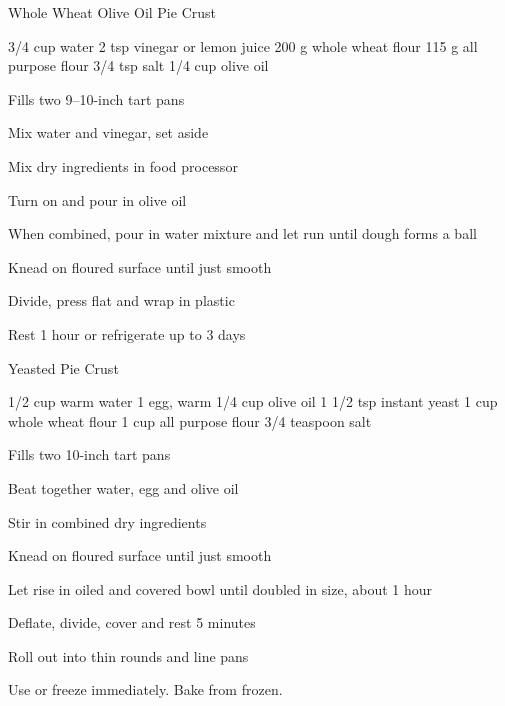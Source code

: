 \begin{recipe}{Whole Wheat Olive Oil Pie Crust}{\vegetarian{}}
\begin{ingredients}
3/4 cup water
2 tsp vinegar or lemon juice
200 g whole wheat flour
115 g all purpose flour
3/4 tsp salt
1/4 cup olive oil
\end{ingredients}
\nextcolumn
Fills two 9--10-inch tart pans
\begin{steps}
    \item Mix water and vinegar, set aside
    \item Mix dry ingredients in food processor
    \item Turn on and pour in olive oil
    \item When combined, pour in water mixture and let run until dough forms a ball
    \item Knead on floured surface until just smooth
    \item Divide, press flat and wrap in plastic
    \item Rest 1 hour or refrigerate up to 3 days
\end{steps}
\end{recipe}

\begin{recipe}{Yeasted Pie Crust}{\vegetarian{}}
\begin{ingredients}
1/2 cup warm water
1 egg, warm
1/4 cup olive oil
1 1/2 tsp instant yeast
1 cup whole wheat flour
1 cup all purpose flour
3/4 teaspoon salt
\end{ingredients}
\nextcolumn
Fills two 10-inch tart pans
\begin{steps}
    \item Beat together water, egg and olive oil
    \item Stir in combined dry ingredients
    \item Knead on floured surface until just smooth
    \item Let rise in oiled and covered bowl until doubled in size, about 1 hour
    \item Deflate, divide, cover and rest 5 minutes
    \item Roll out into thin rounds and line pans
\end{steps}
Use or freeze immediately. Bake from frozen.
\end{recipe}
